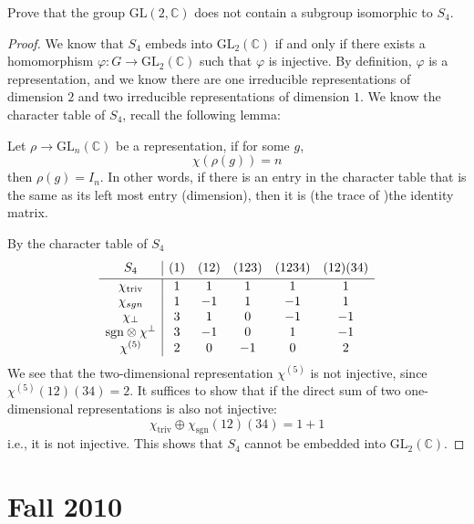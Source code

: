 \documentclass[openany]{book}
\newcommand{\C}{\mathbb{C}}
\begin{document}
\begin{prob}
    Prove that the group \(\text{GL}(2,\mathbb{C})\) does not contain a subgroup isomorphic to \(S_4\).
\end{prob}
\begin{proof}
    We know that $S_4$ embeds into $\text{GL}_2(\C)$ if and only if there exists a homomorphism $\varphi:G\to\text{GL}_2(\C)$ such that $\varphi$ is injective. By definition, $\varphi$ is a representation, and we know there are one irreducible representations of dimension $2$ and two irreducible representations of dimension $1$. We know the character table of $S_4$, recall the following lemma:
    \begin{lem}
        Let $\rho\to\text{GL}_n(\C)$ be a representation, if for some $g$,
        \begin{equation*}
            \chi(\rho(g))=n
        \end{equation*}
        then $\rho(g)=I_n$. In other words, if there is an entry in the character table that is the same as its left most entry (dimension), then it is (the trace of )the identity matrix. 
    \end{lem}
    By the character table of $S_4$
    \[
\begin{array}{c|ccccc}
S_4 & (1) & (12) & (123) & (1234) & (12)(34) \vspace{2pt} \\
\hline
\chi_{\text{triv}} & 1 & 1 & 1 & 1 & 1 \\

\chi_{sgn}  & 1 & -1 & 1 & -1 & 1 \\
\chi_\perp & 3 & 1 & 0 & -1 & -1 \\
\text{sgn}\otimes\chi^\perp & 3 & -1 & 0 & 1 & -1 \\
\chi^{(5)} & 2 & 0 & -1 & 0 & 2 \\
\end{array}
\]
    We see that the two-dimensional representation $\chi^{(5)}$ is not injective, since $\chi^{(5)}(12)(34)=2$. It suffices to show that if the direct sum of two one-dimensional representations is also not injective: 
    \begin{equation*}
        \chi_{\text{triv}}\oplus\chi_{\text{sgn}}(12)(34)=1+1
    \end{equation*}
    i.e., it is not injective. This shows that $S_4$ cannot be embedded into $\text{GL}_2(\C)$.
\end{proof}



\chapter{Fall 2010}
\end{document}
